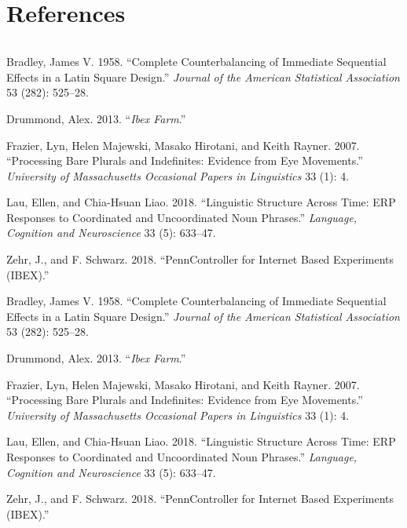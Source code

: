 \documentclass[
  10pt,
  letterpaper,
  DIV=11,
  numbers=noendperiod]{scrartcl}
\newlength{\cslhangindent}
\newlength{\cslentryspacingunit} %
\newenvironment{CSLReferences}[2] %
 {%
  \setlength{\parindent}{0pt}
  \ifodd #1
  \let\oldpar\par
  \def\par{\hangindent=\cslhangindent\oldpar}
  \fi
  \setlength{\parskip}{#2\cslentryspacingunit}
 }%
 {}
\begin{document}
\hypertarget{references}{%
\section{References}\label{references}}

\(~\)

\hypertarget{refs}{}
\begin{CSLReferences}{1}{0}
\leavevmode{}%
Bradley, James V. 1958. {``Complete Counterbalancing of Immediate
Sequential Effects in a Latin Square Design.''} \emph{Journal of the
American Statistical Association} 53 (282): 525--28.

\leavevmode{}%
Drummond, Alex. 2013. {``{\emph{Ibex Farm}}.''}

\leavevmode{}%
Frazier, Lyn, Helen Majewski, Masako Hirotani, and Keith Rayner. 2007.
{``Processing Bare Plurals and Indefinites: Evidence from Eye
Movements.''} \emph{University of Massachusetts Occasional Papers in
Linguistics} 33 (1): 4.

\leavevmode{}%
Lau, Ellen, and Chia-Hsuan Liao. 2018. {``Linguistic Structure Across
Time: ERP Responses to Coordinated and Uncoordinated Noun Phrases.''}
\emph{Language, Cognition and Neuroscience} 33 (5): 633--47.

\leavevmode{}%
Zehr, J., and F. Schwarz. 2018. {``{PennController for Internet Based
Experiments (IBEX)}.''}

\leavevmode{}%
Bradley, James V. 1958. {``Complete Counterbalancing of Immediate
Sequential Effects in a Latin Square Design.''} \emph{Journal of the
American Statistical Association} 53 (282): 525--28.

\leavevmode{}%
Drummond, Alex. 2013. {``{\emph{Ibex Farm}}.''}

\leavevmode{}%
Frazier, Lyn, Helen Majewski, Masako Hirotani, and Keith Rayner. 2007.
{``Processing Bare Plurals and Indefinites: Evidence from Eye
Movements.''} \emph{University of Massachusetts Occasional Papers in
Linguistics} 33 (1): 4.

\leavevmode{}%
Lau, Ellen, and Chia-Hsuan Liao. 2018. {``Linguistic Structure Across
Time: ERP Responses to Coordinated and Uncoordinated Noun Phrases.''}
\emph{Language, Cognition and Neuroscience} 33 (5): 633--47.

\leavevmode{}%
Zehr, J., and F. Schwarz. 2018. {``{PennController for Internet Based
Experiments (IBEX)}.''}

\end{CSLReferences}
\end{document}
